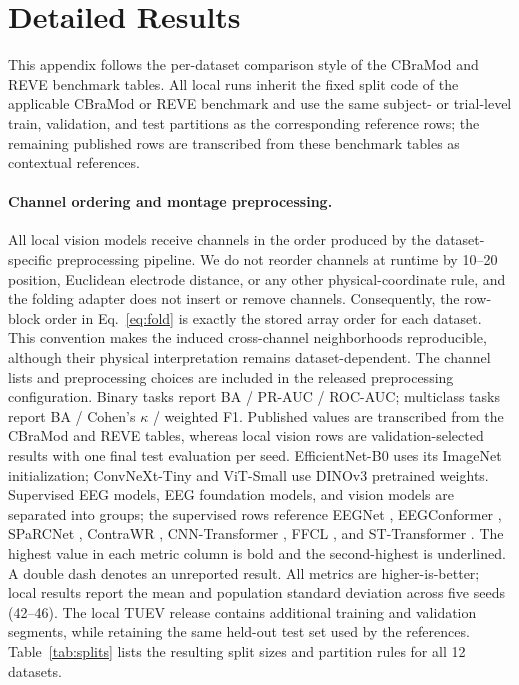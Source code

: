 \section{Detailed Results}
\label{app:detailed-results}

This appendix follows the per-dataset comparison style of the CBraMod and
REVE benchmark tables. All local runs inherit the fixed split code of the
applicable CBraMod or REVE benchmark and use the same subject- or trial-level
train, validation, and test partitions as the corresponding reference rows;
the remaining published rows are transcribed from these benchmark tables as
contextual references.

\paragraph{Channel ordering and montage preprocessing.}
All local vision models receive channels in the order produced by the
dataset-specific preprocessing pipeline. We do not reorder channels at runtime
by 10--20 position, Euclidean electrode distance, or any other
physical-coordinate rule, and the folding adapter does not insert or remove
channels. Consequently, the row-block order in Eq.~\ref{eq:fold} is exactly
the stored array order for each dataset. This convention makes the induced
cross-channel neighborhoods reproducible, although their physical
interpretation remains dataset-dependent. The channel lists and preprocessing
choices are included in the released preprocessing configuration.
Binary tasks report BA / PR-AUC / ROC-AUC;
multiclass tasks report BA / Cohen's $\kappa$ / weighted F1. Published values
are transcribed from the CBraMod and REVE tables, whereas local vision rows
are validation-selected results with one final test evaluation per seed.
EfficientNet-B0 uses its ImageNet initialization; ConvNeXt-Tiny and ViT-Small
use DINOv3 pretrained weights.
Supervised EEG models, EEG foundation models, and vision models are separated
into groups; the supervised rows reference EEGNet \citep{lawhern2018eegnet},
EEGConformer \citep{song2023eeg}, SPaRCNet \citep{jing2023development},
ContraWR \citep{yang2021self}, CNN-Transformer \citep{peh2022transformer},
FFCL \citep{li2022motor}, and ST-Transformer \citep{song2021transformer}.
The highest value in each metric column is bold and the
second-highest is underlined. A double dash denotes an unreported
result. All metrics are higher-is-better; local results report the mean and
population standard deviation across five seeds (42--46). The local TUEV
release contains additional training and validation segments, while retaining
the same held-out test set used by the references. Table~\ref{tab:splits} lists
the resulting split sizes and partition rules for all 12 datasets.

